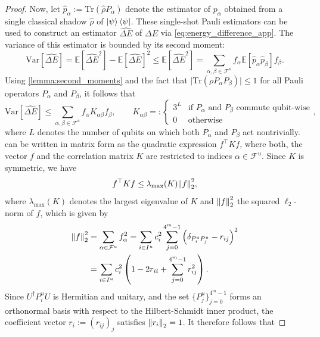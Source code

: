 \begin{proof}
    Now, let $\hat{p}_{\alpha} := \mathrm{Tr}(\hat\rho P_\alpha)$ denote the estimator of $p_\alpha$ obtained from a single classical shadow $\hat{\rho}$ of $\ket{\psi}\bra{\psi}$. These single-shot Pauli estimators can be used to construct an estimator $\hat{\Delta E}$ of $\Delta E$ via \cref{eq:energy_difference_app}. The variance of this estimator is bounded by its second moment:
    \begin{equation}
        \mathrm{Var}[\hat{\Delta E}]=\mathbb{E}\left[\hat{\Delta E}^2\right]-\mathbb{E}\left[\hat{\Delta E}\right]^2\leq \mathbb{E}\left[\hat{\Delta E}^2\right]=\sum_{\alpha, \beta\in\mathcal{F}^u}f_\alpha\mathbb{E}\left[\hat{p}_\alpha \hat{p}_\beta\right]f_\beta.
    \end{equation}
    Using \cref{lemma:second_moments} and the fact that $\lvert\mathrm{Tr}(\rho P_\alpha P_\beta)\rvert\leq 1$ for all Pauli operators $P_\alpha$ and $P_\beta$, it follows that
    \begin{equation}
        \label{eq:app:2}
        \mathrm{Var}[\hat{\Delta E}]\leq \sum_{\alpha, \beta\in\mathcal{F}^u}f_\alpha K_{\alpha \beta}f_\beta,\qquad K_{\alpha \beta}=:\begin{cases}
        3^L&\text{if $P_\alpha$ and $P_\beta$ commute qubit-wise}\\
        0&\text{otherwise}
    \end{cases},
    \end{equation}
    where $L$ denotes the number of qubits on which both $P_\alpha$ and $P_\beta$ act nontrivially.
     can be written in matrix form as the quadratic expression $f^\top Kf$, where both, the vector $f$ and the correlation matrix $K$ are restricted to indices $\alpha\in \mathcal{F}^u$. Since $K$ is symmetric, we have
    \begin{equation}
        f^\top Kf\leq \lambda_\mathrm{max}(K) \norm{f}_2^2,
    \end{equation}
    where $\lambda_\mathrm{max}(K)$ denotes the largest eigenvalue of $K$ and $\norm{f}^2_2$ the squared $\ell_2$-norm of $f$, which is given by
\begin{align}
    \norm{f}^2_2 &= \sum_{\alpha\in \mathcal{F}^u} f_\alpha^2=\sum_{i\in I^u}c_i^2\sum^{4^m-1}_{j=0}\left(\delta_{P^u_iP^u_j}-r_{ij} \right)^2\\
    &=\sum_{i\in I^u}c_i^2\left(1-2r_{ii}+\sum^{4^m-1}_{j=0}r_{ij}^2\right).
\end{align}
Since $U^\dagger P_i^u U$ is Hermitian and unitary, and the set $\{P_j^u\}^{4^m-1}_{j=0}$ forms an orthonormal basis with respect to the Hilbert-Schmidt inner product, the coefficient vector $r_i:=(r_{ij})_j$ satisfies $\norm{r_i}_2=1$. It therefore follows that

\end{proof}
